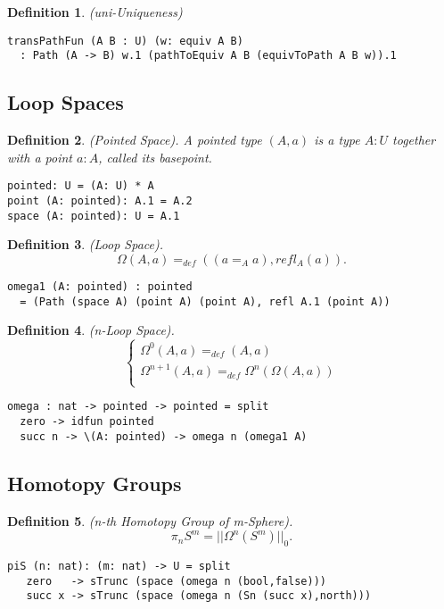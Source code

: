 \documentclass{article}
\newtheorem{definition}{Definition}
\begin{document}
\begin{definition} (uni-Uniqueness)
\begin{lstlisting}
transPathFun (A B : U) (w: equiv A B)
  : Path (A -> B) w.1 (pathToEquiv A B (equivToPath A B w)).1
\end{lstlisting}
\end{definition}

\newpage
\subsection{Loop Spaces}

\begin{definition} (Pointed Space). A pointed type $(A,a)$ is a type $A:U$
together with a point $a:A$, called its basepoint.
\begin{lstlisting}
pointed: U = (A: U) * A
point (A: pointed): A.1 = A.2
space (A: pointed): U = A.1
\end{lstlisting}
\end{definition}

\begin{definition} (Loop Space).
$$\Omega(A,a) =_{def} ((a =_A a), refl_A(a)).$$
\begin{lstlisting}
omega1 (A: pointed) : pointed
  = (Path (space A) (point A) (point A), refl A.1 (point A))
\end{lstlisting}
\end{definition}

\begin{definition} (n-Loop Space).
$$
\begin{cases}
\Omega^0(A, a) =_{def} (A, a)\\
\Omega^{n+1}(A,a) =_{def} \Omega^{n}(\Omega(A,a))\\
\end{cases}
$$
\begin{lstlisting}
omega : nat -> pointed -> pointed = split
  zero -> idfun pointed
  succ n -> \(A: pointed) -> omega n (omega1 A)
\end{lstlisting}
\end{definition}

\newpage
\subsection{Homotopy Groups}

\begin{definition} (n-th Homotopy Group of m-Sphere).
$$\pi_{n}S^{m} = ||\Omega^{n}(S^{m})||_0.$$
\begin{lstlisting}
piS (n: nat): (m: nat) -> U = split
   zero   -> sTrunc (space (omega n (bool,false)))
   succ x -> sTrunc (space (omega n (Sn (succ x),north)))
\end{lstlisting}
\end{definition}
\end{document}

